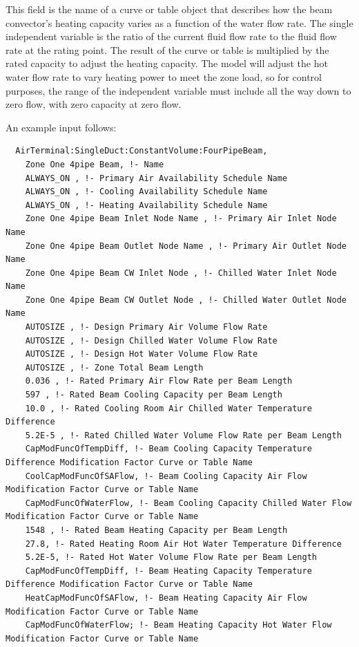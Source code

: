 This field is the name of a curve or table object that describes how the beam convector's heating capacity varies as a function of the water flow rate. The single independent variable is the ratio of the current fluid flow rate to the fluid flow rate at the rating point. The result of the curve or table is multiplied by the rated capacity to adjust the heating capacity. The model will adjust the hot water flow rate to vary heating power to meet the zone load, so for control purposes, the range of the independent variable must include all the way down to zero flow, with zero capacity at zero flow.

An example input follows:

\begin{lstlisting}
  AirTerminal:SingleDuct:ConstantVolume:FourPipeBeam,
    Zone One 4pipe Beam, !- Name
    ALWAYS_ON , !- Primary Air Availability Schedule Name
    ALWAYS_ON , !- Cooling Availability Schedule Name
    ALWAYS_ON , !- Heating Availability Schedule Name
    Zone One 4pipe Beam Inlet Node Name , !- Primary Air Inlet Node Name
    Zone One 4pipe Beam Outlet Node Name , !- Primary Air Outlet Node Name
    Zone One 4pipe Beam CW Inlet Node , !- Chilled Water Inlet Node Name
    Zone One 4pipe Beam CW Outlet Node , !- Chilled Water Outlet Node Name
    AUTOSIZE , !- Design Primary Air Volume Flow Rate
    AUTOSIZE , !- Design Chilled Water Volume Flow Rate
    AUTOSIZE , !- Design Hot Water Volume Flow Rate
    AUTOSIZE , !- Zone Total Beam Length
    0.036 , !- Rated Primary Air Flow Rate per Beam Length
    597 , !- Rated Beam Cooling Capacity per Beam Length
    10.0 , !- Rated Cooling Room Air Chilled Water Temperature Difference
    5.2E-5 , !- Rated Chilled Water Volume Flow Rate per Beam Length
    CapModFuncOfTempDiff, !- Beam Cooling Capacity Temperature Difference Modification Factor Curve or Table Name
    CoolCapModFuncOfSAFlow, !- Beam Cooling Capacity Air Flow Modification Factor Curve or Table Name
    CapModFuncOfWaterFlow, !- Beam Cooling Capacity Chilled Water Flow Modification Factor Curve or Table Name
    1548 , !- Rated Beam Heating Capacity per Beam Length
    27.8, !- Rated Heating Room Air Hot Water Temperature Difference
    5.2E-5, !- Rated Hot Water Volume Flow Rate per Beam Length
    CapModFuncOfTempDiff, !- Beam Heating Capacity Temperature Difference Modification Factor Curve or Table Name
    HeatCapModFuncOfSAFlow, !- Beam Heating Capacity Air Flow Modification Factor Curve or Table Name
    CapModFuncOfWaterFlow; !- Beam Heating Capacity Hot Water Flow Modification Factor Curve or Table Name
\end{lstlisting}

